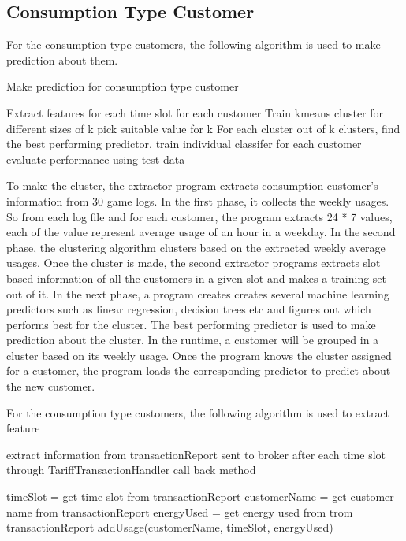\subsection{Consumption Type Customer}
For the consumption type customers, the following algorithm is used to make prediction about them.
\begin{algorithm}
\caption{Make prediction for consumption type customer}
\begin{algorithmic} 
\STATE Extract features for each time slot for each customer
\STATE Train kmeans cluster for different sizes of k
\STATE pick suitable value for k
\STATE For each cluster out of k clusters, find the best performing predictor.
\STATE train individual classifer for each customer
\STATE evaluate performance using test data
\end{algorithmic}
\end{algorithm}

To make the cluster, the extractor program extracts consumption customer's information from 30 game logs. In the first phase, it collects the weekly usages. So from each log file and for each customer, the program extracts 24 * 7 values, each of the value represent average usage of an hour in a weekday. In the second phase, the clustering algorithm clusters based on the extracted weekly average usages. Once the cluster is made, the second extractor programs extracts slot based information of all the customers in a given slot and makes a training set out of it. In the next phase, a program creates creates several machine learning predictors such as linear regression, decision trees etc and figures out which performs best for the cluster. The best performing predictor is used to make prediction about the cluster. In the runtime, a customer will be grouped in a cluster based on its weekly usage. Once the program knows the cluster assigned for a customer, the program loads the corresponding predictor to predict about the new customer. 


For the consumption type customers, the following algorithm is used to extract feature
\begin{algorithm}
\caption{extract information from transactionReport sent to broker after each time slot through TariffTransactionHandler call back method}
\begin{algorithmic} 
\STATE timeSlot = get time slot from transactionReport
\STATE customerName = get customer name from transactionReport
\STATE energyUsed = get energy used from trom transactionReport
\STATE addUsage(customerName, timeSlot, energyUsed)
\end{algorithmic}
\end{algorithm}

